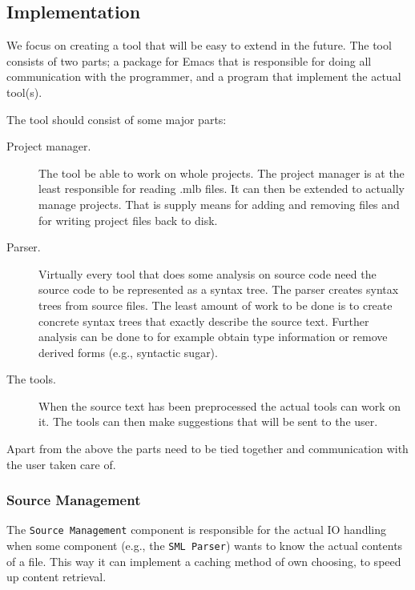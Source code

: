 \documentclass[a4paper,oneside]{memoir}
\begin{document}


\subsection{Implementation}
We focus on creating a tool that will be easy to extend in the
future. The tool consists of two parts; a package for Emacs that is
responsible for doing all communication with the programmer, and a
program that implement the actual tool(s).

The tool should consist of some major parts:
\begin{description}
\item[Project manager.] The tool be able to work on whole
  projects. The project manager is at the least responsible for
  reading .mlb files. It can then be extended to actually manage
  projects. That is supply means for adding and removing files and for
  writing project files back to disk.
\item[Parser.] Virtually every tool that does some analysis on source
  code need the source code to be represented as a syntax tree. The
  parser creates syntax trees from source files. The least amount of
  work to be done is to create concrete syntax trees that exactly
  describe the source text. Further analysis can be done to for
  example obtain type information or remove derived forms (e.g.,
  syntactic sugar).
\item[The tools.] When the source text has been preprocessed the
  actual tools can work on it. The tools can then make suggestions
  that will be sent to the user.
\end{description}

Apart from the above the parts need to be tied together and
communication with the user taken care of.


\subsubsection{Source Management}


The \texttt{Source Management} component is responsible for the actual IO handling when
some component (e.g., the \texttt{SML Parser}) wants to know the actual contents
of a file. This way it can implement a caching method of own choosing, to speed
up content retrieval.
\end{document}
